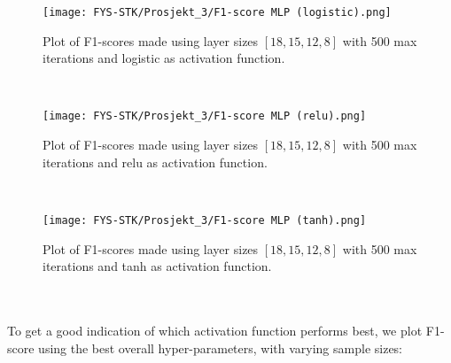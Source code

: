 \documentclass[english,notitlepage,reprint,nofootinbib]{revtex4-1}  %
\begin{document}
\begin{figure}[H]
    \centering
    \texttt{[image: FYS-STK/Prosjekt\_3/F1-score MLP (logistic).png]}
    \caption{Plot of F1-scores made using layer sizes $[18,15,12,8]$ with 500 max iterations and logistic as activation function.}
    \label{fig: 7}
\end{figure}
\\
\begin{figure}[H]
    \centering
    \texttt{[image: FYS-STK/Prosjekt\_3/F1-score MLP (relu).png]}
    \caption{Plot of F1-scores made using layer sizes $[18,15,12,8]$ with 500 max iterations and relu as activation function.}
    \label{fig: 8}
\end{figure}
\\
\begin{figure}[H]
    \centering
    \texttt{[image: FYS-STK/Prosjekt\_3/F1-score MLP (tanh).png]}
    \caption{Plot of F1-scores made using layer sizes $[18,15,12,8]$ with 500 max iterations and tanh as activation function.}
    \label{fig: 9}
\end{figure}
\\
\\
To get a good indication of which activation function performs best, we plot F1-score using the best overall hyper-parameters, with varying sample sizes: %
\end{document}

